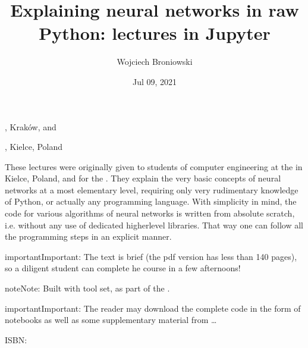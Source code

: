 \documentclass[letterpaper,10pt,english]{jupyterBook}
\title{Explaining neural networks in raw Python: lectures in Jupyter}
\date{Jul 09, 2021}
\author{Wojciech Broniowski}
\begin{document}
\pagestyle{empty}
\sphinxmaketitle
\pagestyle{plain}
\sphinxtableofcontents
\pagestyle{normal}
\label{\detokenize{docs/index::doc}}


\sphinxAtStartPar
{}

\sphinxAtStartPar
{}, Kraków, and

\sphinxAtStartPar
{}, Kielce, Poland

\sphinxAtStartPar
These lectures were originally given to students of computer engineering at the  in Kielce, Poland, and for
the . They explain the very basic concepts of neural networks at a most elementary level, requiring only very rudimentary knowledge of Python, or actually any programming language. With simplicity in mind, the code for various algorithms of neural networks is written from absolute scratch, i.e. without any use of dedicated higher\sphinxhyphen{}level libraries. That way one can follow all the programming steps in an explicit manner.

\begin{sphinxadmonition}{important}{Important:}
\sphinxAtStartPar
The text is brief (the pdf version has less than 140 pages), so a diligent student can complete he course in a few afternoons!
\end{sphinxadmonition}

\begin{sphinxadmonition}{note}{Note:}
\sphinxAtStartPar
Built with  tool set, as part of the
.
\end{sphinxadmonition}

\begin{sphinxadmonition}{important}{Important:}
\sphinxAtStartPar
The reader may download the complete code in the form of
 notebooks as well as some supplementary material from …
\end{sphinxadmonition}

\sphinxAtStartPar
ISBN: 
\end{document}
